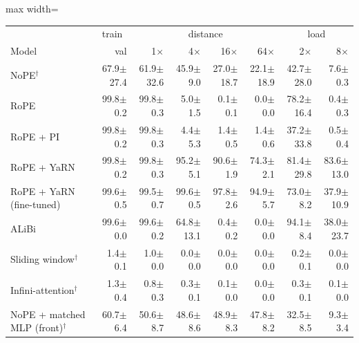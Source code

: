 \begin{table}\centering\small
\setlength{\tabcolsep}{4pt}
\begin{adjustbox}{max width=\linewidth}
\begin{tabular}{lrrrrrrr}
\toprule
 & \multicolumn{1}{c}{train} & \multicolumn{4}{c}{distance} & \multicolumn{2}{c}{load} \\
Model & val & 1$\times$ & 4$\times$ & 16$\times$ & 64$\times$ & 2$\times$ & 8$\times$ \\
\midrule
NoPE$^\dagger$ & 67.9{\scriptsize$\pm$27.4} & 61.9{\scriptsize$\pm$32.6} & 45.9{\scriptsize$\pm$9.0} & 27.0{\scriptsize$\pm$18.7} & 22.1{\scriptsize$\pm$18.9} & 42.7{\scriptsize$\pm$28.0} & 7.6{\scriptsize$\pm$0.3} \\
RoPE & 99.8{\scriptsize$\pm$0.2} & 99.8{\scriptsize$\pm$0.3} & 5.0{\scriptsize$\pm$1.5} & 0.1{\scriptsize$\pm$0.1} & 0.0{\scriptsize$\pm$0.0} & 78.2{\scriptsize$\pm$16.4} & 0.4{\scriptsize$\pm$0.3} \\
RoPE + PI & 99.8{\scriptsize$\pm$0.2} & 99.8{\scriptsize$\pm$0.3} & 4.4{\scriptsize$\pm$5.3} & 1.4{\scriptsize$\pm$0.5} & 1.4{\scriptsize$\pm$0.6} & 37.2{\scriptsize$\pm$33.8} & 0.5{\scriptsize$\pm$0.4} \\
RoPE + YaRN & 99.8{\scriptsize$\pm$0.2} & 99.8{\scriptsize$\pm$0.3} & 95.2{\scriptsize$\pm$5.1} & 90.6{\scriptsize$\pm$1.9} & 74.3{\scriptsize$\pm$2.1} & 81.4{\scriptsize$\pm$29.8} & 83.6{\scriptsize$\pm$13.0} \\
RoPE + YaRN (fine-tuned) & 99.6{\scriptsize$\pm$0.5} & 99.5{\scriptsize$\pm$0.7} & 99.6{\scriptsize$\pm$0.5} & 97.8{\scriptsize$\pm$2.6} & 94.9{\scriptsize$\pm$5.7} & 73.0{\scriptsize$\pm$8.2} & 37.9{\scriptsize$\pm$10.9} \\
ALiBi & 99.6{\scriptsize$\pm$0.0} & 99.6{\scriptsize$\pm$0.2} & 64.8{\scriptsize$\pm$13.1} & 0.4{\scriptsize$\pm$0.2} & 0.0{\scriptsize$\pm$0.0} & 94.1{\scriptsize$\pm$8.4} & 38.0{\scriptsize$\pm$23.7} \\
Sliding window$^\dagger$ & 1.4{\scriptsize$\pm$0.1} & 1.0{\scriptsize$\pm$0.0} & 0.0{\scriptsize$\pm$0.0} & 0.0{\scriptsize$\pm$0.0} & 0.0{\scriptsize$\pm$0.0} & 0.2{\scriptsize$\pm$0.1} & 0.0{\scriptsize$\pm$0.0} \\
Infini-attention$^\dagger$ & 1.3{\scriptsize$\pm$0.4} & 0.8{\scriptsize$\pm$0.3} & 0.3{\scriptsize$\pm$0.1} & 0.1{\scriptsize$\pm$0.0} & 0.0{\scriptsize$\pm$0.0} & 0.3{\scriptsize$\pm$0.1} & 0.1{\scriptsize$\pm$0.0} \\
NoPE + matched MLP (front)$^\dagger$ & 60.7{\scriptsize$\pm$6.4} & 50.6{\scriptsize$\pm$8.7} & 48.6{\scriptsize$\pm$8.6} & 48.9{\scriptsize$\pm$8.3} & 47.8{\scriptsize$\pm$8.2} & 32.5{\scriptsize$\pm$8.5} & 9.3{\scriptsize$\pm$3.4} \\

\end{tabular}
\end{adjustbox}
\end{table}
